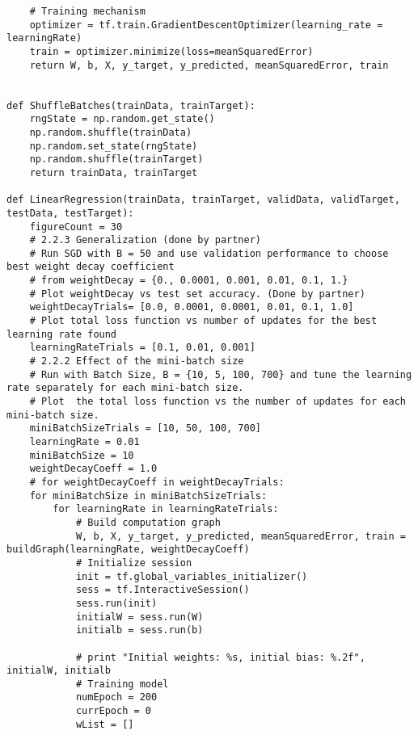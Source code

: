 \documentclass[a4paper,12pt]{article}
\begin{document}
\begin{verbatim}
    # Training mechanism
    optimizer = tf.train.GradientDescentOptimizer(learning_rate = learningRate)
    train = optimizer.minimize(loss=meanSquaredError)
    return W, b, X, y_target, y_predicted, meanSquaredError, train


def ShuffleBatches(trainData, trainTarget):
    rngState = np.random.get_state()
    np.random.shuffle(trainData)
    np.random.set_state(rngState)
    np.random.shuffle(trainTarget)
    return trainData, trainTarget

def LinearRegression(trainData, trainTarget, validData, validTarget, testData, testTarget):
    figureCount = 30
    # 2.2.3 Generalization (done by partner) 
    # Run SGD with B = 50 and use validation performance to choose best weight decay coefficient
    # from weightDecay = {0., 0.0001, 0.001, 0.01, 0.1, 1.}
    # Plot weightDecay vs test set accuracy. (Done by partner) 
    weightDecayTrials= [0.0, 0.0001, 0.0001, 0.01, 0.1, 1.0]
    # Plot total loss function vs number of updates for the best learning rate found
    learningRateTrials = [0.1, 0.01, 0.001]
    # 2.2.2 Effect of the mini-batch size
    # Run with Batch Size, B = {10, 5, 100, 700} and tune the learning rate separately for each mini-batch size.
    # Plot  the total loss function vs the number of updates for each mini-batch size.
    miniBatchSizeTrials = [10, 50, 100, 700]
    learningRate = 0.01
    miniBatchSize = 10
    weightDecayCoeff = 1.0
    # for weightDecayCoeff in weightDecayTrials:
    for miniBatchSize in miniBatchSizeTrials:
        for learningRate in learningRateTrials:
            # Build computation graph
            W, b, X, y_target, y_predicted, meanSquaredError, train = buildGraph(learningRate, weightDecayCoeff)
            # Initialize session
            init = tf.global_variables_initializer()
            sess = tf.InteractiveSession()
            sess.run(init)
            initialW = sess.run(W)  
            initialb = sess.run(b)

            # print "Initial weights: %s, initial bias: %.2f", initialW, initialb
            # Training model
            numEpoch = 200
            currEpoch = 0
            wList = []


\end{verbatim}
\end{document}
